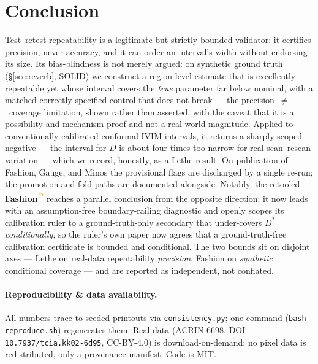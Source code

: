 \documentclass[11pt]{article}
\newcommand{\PROV}{\textsuperscript{\textcolor{orange}{\,P}}}
\newcommand{\Dstar}{D^{*}}
\begin{document}
\section{Conclusion}
Test--retest repeatability is a legitimate but strictly bounded validator: it certifies
precision, never accuracy, and it can order an interval's width without endorsing its size.
Its bias-blindness is not merely argued: on synthetic ground truth (\S\ref{sec:reverb}, SOLID) we
construct a region-level estimate that is excellently repeatable yet whose interval covers the
\emph{true} parameter far below nominal, with a matched correctly-specified control that does not
break --- the precision~$\ne$~coverage limitation, shown rather than asserted, with the caveat that
it is a possibility-and-mechanism proof and not a real-world magnitude.
Applied to conventionally-calibrated conformal IVIM intervals, it returns a sharply-scoped
negative --- the interval for $D$ is about four times too narrow for real scan--rescan
variation --- which we record, honestly, as a Lethe result. On publication of Fashion,
Gauge, and Minos the provisional flags are discharged by a single re-run; the promotion and
fold paths are documented alongside. Notably, the retooled \textbf{Fashion}\PROV{} reaches a
parallel conclusion from the opposite direction: it now leads with an assumption-free
boundary-railing diagnostic and openly scopes its calibration ruler to a ground-truth-only
secondary that under-covers $\Dstar$ \emph{conditionally}, so the ruler's own paper now
agrees that a ground-truth-free calibration certificate is bounded and conditional. The two
bounds sit on disjoint axes --- Lethe on real-data repeatability \emph{precision}, Fashion on
\emph{synthetic} conditional coverage --- and are reported as independent, not conflated.

\paragraph{Reproducibility \& data availability.} All numbers trace to seeded printouts via
\texttt{consistency.py}; one command (\texttt{bash reproduce.sh}) regenerates them. Real
data (ACRIN-6698, DOI \texttt{10.7937/tcia.kk02-6d95}, CC-BY-4.0) is download-on-demand; no
pixel data is redistributed, only a provenance manifest. Code is MIT.
\end{document}
